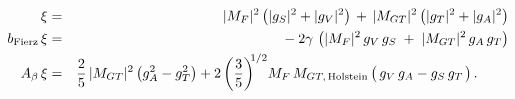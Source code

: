 %
%
%
\begin{eqnarray}
\xi &=& 
	|M_F|^2    \left( |g_S|^2 + |g_V|^2 \right) \,+\, 
	|M_{GT}|^2 \left( |g_T|^2 + |g_A|^2 \right)
	\label{eq:jtw_xi_integrated_LH} 
	\\
\bFierz \, \xi &=& 
	- \: 2 \gamma \,
	\left( |M_F|^2 \, g_V \,g_S  \;+\; |M_{GT}|^2 \, g_A \, g_T \right) 
	\label{eq:jtw_bxi_integrated_LH} 
	\\
\Abeta \, \xi &=& 
	\frac{2}{5} \, |M_{GT}|^2 \left( g_A^2 - g_T^2 \right) + 
	2 \left( \frac{3}{5} \right)^{\!\! 1/2} \!
	M_F\,M_{GT, \textrm{\,Holstein}} \left(\, g_V \, g_A - g_S \, g_T \phantom{g_A^2 \!\!\!\! \!\! } \right).
	\;\;\;\; \;\;\;\;
	\label{eq:jtw_Abetaxi_integrated_LH}
\end{eqnarray}
%